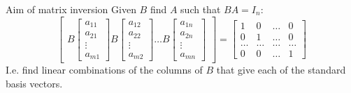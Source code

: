 \documentclass{beamer}
\begin{document}
\begin{frame}{Aim of matrix inversion}
  Given $B$ find $A$ such that $BA=I_n$:\vfill
  \begin{equation*}
    \left[
      \begin{array}{cccc}
        B \left[
	\begin{array}{c}
          a_{11}\\
          a_{21}\\
          \vdots\\
          a_{m1}
	\end{array}
        \right]
        B \left[
	\begin{array}{c}
          a_{12}\\
          a_{22}\\
          \vdots\\
          a_{m2}
	\end{array}
        \right]
        \dots
        B \left[
	\begin{array}{c}
          a_{1n}\\
          a_{2n}\\
          \vdots\\
          a_{mn}
	\end{array}
        \right]
      \end{array}
    \right]= \left[
      \begin{array}{cccc}
        1 & 0 & \dots & 0\\
        0 & 1 & \dots & 0\\
        \dots & \dots & \dots & \dots\\
        0 & 0 & \dots & 1
      \end{array}
    \right]
  \end{equation*}\vfill
  I.e. find linear combinations of the columns of $B$ that give each of the standard basis vectors.
\end{frame}
\end{document}
